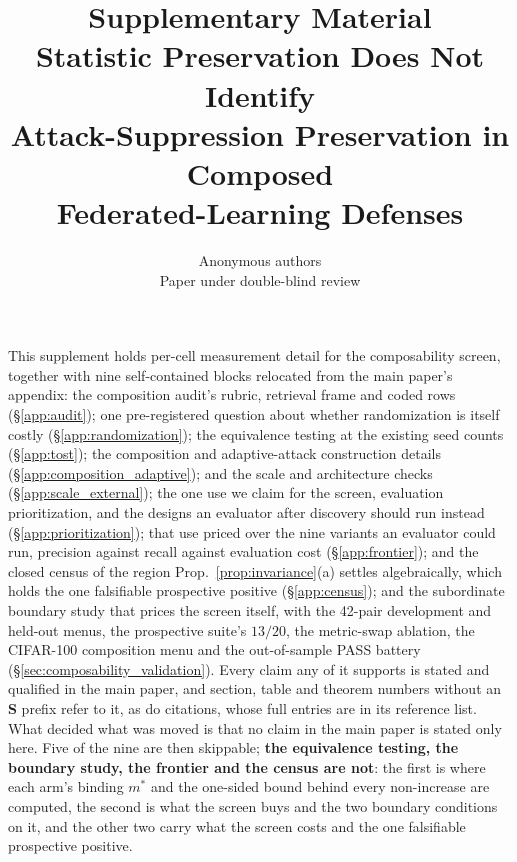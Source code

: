 \documentclass{article}
\title{Supplementary Material\\Statistic Preservation Does Not Identify\\Attack-Suppression Preservation in Composed\\Federated-Learning Defenses}
\author{Anonymous authors\\
Paper under double-blind review}
\begin{document}
\maketitle

\noindent This supplement holds per-cell measurement detail for the composability
screen, together with nine self-contained blocks relocated from the main paper's
appendix: the composition audit's rubric, retrieval frame and coded rows
(§\ref{app:audit}); one pre-registered question about whether randomization is itself
costly (§\ref{app:randomization}); the equivalence testing at the existing seed counts
(§\ref{app:tost}); the composition and adaptive-attack construction details
(§\ref{app:composition_adaptive}); and the scale and architecture checks
(§\ref{app:scale_external}); the one use we claim for the screen, evaluation
prioritization, and the designs an evaluator after discovery should run instead
(§\ref{app:prioritization}); that use priced over the nine variants an evaluator could
run, precision against recall against evaluation cost (§\ref{app:frontier}); and the
closed census of the region Prop.~\ref{prop:invariance}(a) settles algebraically, which
holds the one falsifiable prospective positive (§\ref{app:census}); and the subordinate
boundary study that prices the screen itself, with the 42-pair development and held-out
menus, the prospective suite's $13/20$, the metric-swap ablation, the CIFAR-100
composition menu and the out-of-sample PASS battery (§\ref{sec:composability_validation}). Every claim any of it supports is stated and qualified in
the main paper, and section, table and theorem numbers without an \textbf{S} prefix
refer to it, as do citations, whose full entries are in its reference list. What decided
what was moved is that no claim in the main paper is stated only here. Five of the nine
are then skippable; \textbf{the equivalence testing, the boundary study, the frontier and the
census are not}: the first is where each arm's binding $m^\ast$ and the one-sided bound behind
every non-increase are computed, the second is what the screen buys and the two boundary
conditions on it, and the other two carry what the screen costs and the one falsifiable
prospective positive.
\end{document}
